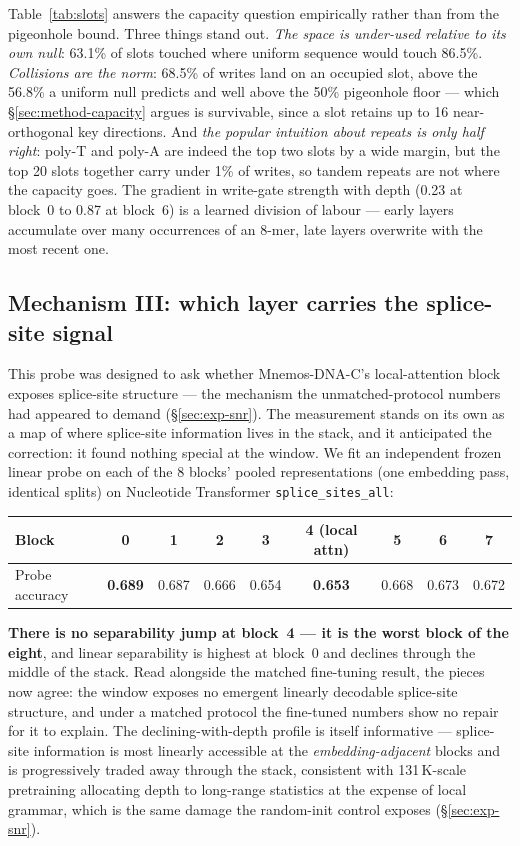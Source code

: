 \documentclass[11pt]{article}
\theoremstyle{plain}
\newcommand{\best}[1]{\textbf{#1}}
\begin{document}
Table~\ref{tab:slots} answers the capacity question empirically rather than from the pigeonhole
bound. Three things stand out. \emph{The space is under-used relative to its own null}: 63.1\% of
slots touched where uniform sequence would touch 86.5\%. \emph{Collisions are the norm}: 68.5\% of
writes land on an occupied slot, above the 56.8\% a uniform null predicts and well above the 50\%
pigeonhole floor --- which \S\ref{sec:method-capacity} argues is survivable, since a slot retains
up to 16 near-orthogonal key directions. And \emph{the popular intuition about repeats is only
half right}: poly-T and poly-A are indeed the top two slots by a wide margin, but the top 20 slots
together carry under 1\% of writes, so tandem repeats are not where the capacity goes. The
gradient in write-gate strength with depth (0.23 at block~0 to 0.87 at block~6) is a learned
division of labour --- early layers accumulate over many occurrences of an 8-mer, late layers
overwrite with the most recent one.

\FloatBarrier
\subsection{Mechanism III: which layer carries the splice-site signal}\label{sec:exp-layers}

This probe was designed to ask whether Mnemos-DNA-C's local-attention block exposes
splice-site structure --- the mechanism the unmatched-protocol numbers had appeared to demand
(\S\ref{sec:exp-snr}). The measurement stands on its own as a map of where splice-site
information lives in the stack, and it anticipated the correction: it found nothing special at
the window. We fit an independent
frozen linear probe on each of the 8 blocks' pooled representations (one embedding pass, identical
splits) on Nucleotide Transformer \texttt{splice\_sites\_all}:

\begin{center}\small
\begin{tabular}{lcccccccc}
\toprule
Block & 0 & 1 & 2 & 3 & \textbf{4 (local attn)} & 5 & 6 & 7 \\
\midrule
Probe accuracy & \best{0.689} & 0.687 & 0.666 & 0.654 & \textbf{0.653} & 0.668 & 0.673 & 0.672 \\
\bottomrule
\end{tabular}
\end{center}

\textbf{There is no separability jump at block~4 --- it is the worst block of the eight}, and
linear separability is highest at block~0 and declines through the middle of the stack. Read
alongside the matched fine-tuning result, the pieces now agree: the window exposes no emergent
linearly decodable splice-site structure, and under a matched protocol the fine-tuned numbers
show no repair for it to explain. The declining-with-depth profile is itself informative ---
splice-site information is most linearly accessible at the \emph{embedding-adjacent} blocks and
is progressively traded away through the stack, consistent with 131\,K-scale pretraining
allocating depth to long-range statistics at the expense of local grammar, which is the same
damage the random-init control exposes (\S\ref{sec:exp-snr}).
\end{document}
